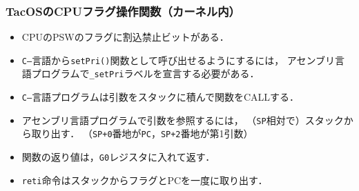 \documentclass[dvipdfmx]{beamer}
\begin{document}
\begin{frame}
  \frametitle{TacOSのCPUフラグ操作関数（カーネル内）}
  
  \begin{itemize}
  \item CPUのPSWのフラグに割込禁止ビットがある．
  \item {\tt C--}言語から{\tt setPri()}関数として呼び出せるようにするには，
    アセンブリ言語プログラムで{\tt \_setPri}ラベルを宣言する必要がある．
  \item {\tt C--}言語プログラムは引数をスタックに積んで関数をCALLする．
  \item アセンブリ言語プログラムで引数を参照するには，
    （{\tt SP}相対で）スタックから取り出す．
    （{\tt SP+0}番地が{\tt PC}，{\tt SP+2}番地が第1引数）
  \item 関数の返り値は，{\tt G0}レジスタに入れて返す．
  \item {\tt reti}命令はスタックからフラグとPCを一度に取り出す．
  \end{itemize}
\end{frame}
\end{document}
